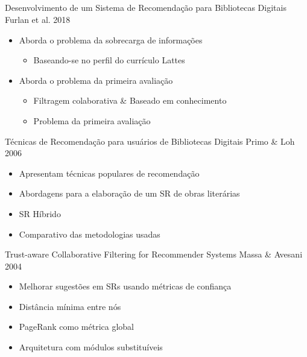 \documentclass{beamer}
\begin{document}
\subsection[Trabalhos Relacionados]{}

\begin{frame}{Desenvolvimento de um Sistema de Recomendação para Bibliotecas Digitais}
  {Furlan et al. 2018}
  
  \begin{itemize}
    \item Aborda o problema da sobrecarga de informações 
    \begin{itemize}
      \item Baseando-se no perfil do currículo Lattes
    \end{itemize}

    \item Aborda o problema da primeira avaliação 
    \begin{itemize}
      \item Filtragem colaborativa \& Baseado em conhecimento
      \item Problema da primeira avaliação
    \end{itemize}
  \end{itemize}
\end{frame}

\begin{frame}{Técnicas de Recomendação para usuários de Bibliotecas Digitais}
  {Primo \& Loh 2006}
  
  \begin{itemize}
    \item Apresentam técnicas populares de recomendação 
    \item Abordagens para a elaboração de um SR de obras literárias
    \item SR Híbrido
    \item Comparativo das metodologias usadas
  \end{itemize}
\end{frame}

\begin{frame}{Trust-aware Collaborative Filtering for Recommender Systems}
  {Massa \& Avesani 2004}
  
  \begin{itemize}
    \item Melhorar sugestões em SRs usando métricas de confiança 
    \item Distância mínima entre nós
    \item PageRank como métrica global
    \item Arquitetura com módulos substituíveis
  \end{itemize}
\end{frame}
\end{document}
